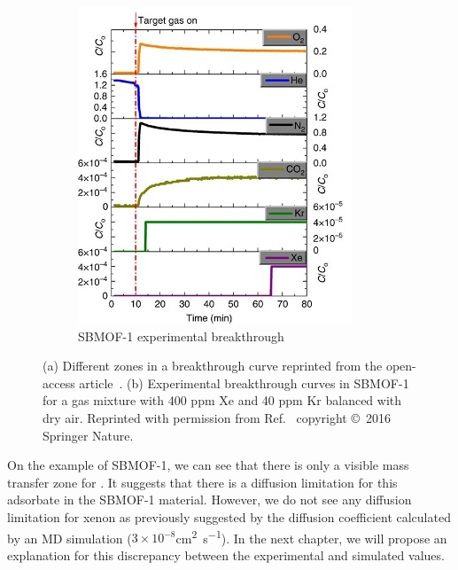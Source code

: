 \documentclass[main]{subfiles}
\begin{document}
\begin{figure}[ht]
\begin{subfigure}[b]{0.4\textwidth}
    \includegraphics[width=\textwidth]{figures/6-perspectives/sbmof_breakthrough.jpg}
    \caption{SBMOF-1 experimental breakthrough}\label{fgr:sbmof_breakthrough}
  \end{subfigure}
  \caption{ (a) Different zones in a breakthrough curve reprinted from the open-access article~\cite{Sharma_2023}. (b) Experimental breakthrough curves in SBMOF-1 for a gas mixture with 400 ppm Xe and 40 ppm Kr balanced with dry air. Reprinted with permission from Ref.~\cite{Banerjee_2016} copyright \copyright\ 2016 Springer Nature. }\label{fgr:breakthrough}
\end{figure}

On the example of SBMOF-1, we can see that there is only a visible mass transfer zone for . It suggests that there is a diffusion limitation for this adsorbate in the SBMOF-1 material. However, we do not see any diffusion limitation for xenon as previously suggested by the diffusion coefficient calculated by an MD simulation ($3\times 10^{-8}$\si{\square\cm\per\s}). In the next chapter, we will propose an explanation for this discrepancy between the experimental and simulated values.
\end{document}
